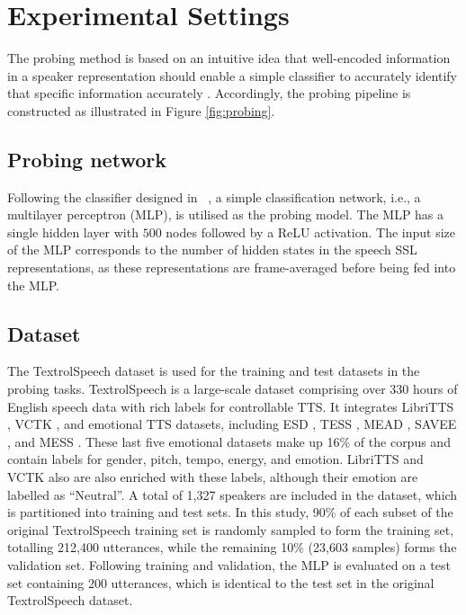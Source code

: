 \documentclass[cameraready]{Interspeech}
\begin{document}
\section{Experimental Settings}

The probing method is based on an intuitive idea that well-encoded information in a speaker representation should enable a simple classifier to accurately identify that specific information accurately \cite{wang17g_Interspeech}. Accordingly, the probing pipeline is constructed as illustrated in Figure \ref{fig:probing}.


\subsection{Probing network}

Following the classifier designed in~ \cite{wang17g_Interspeech,raj19asru}, a simple classification network, i.e., a multilayer perceptron (MLP), is utilised as the probing model. The MLP has a single hidden layer with $500$ nodes followed by a ReLU activation. The input size of the MLP corresponds to the number of hidden states in the speech SSL representations, as these representations are frame-averaged before being fed into the MLP.





\subsection{Dataset}
\label{sec:dataset}

The TextrolSpeech dataset \cite{ji2024icassp} is used for the training and test datasets in the probing tasks. TextrolSpeech is a large-scale dataset comprising over 330 hours of English speech data with rich labels for controllable TTS. It integrates LibriTTS \cite{zen19_interspeech}, VCTK \cite{vctk}, and emotional TTS datasets, including ESD \cite{ZHOU20221ESD}, TESS \cite{tess}, MEAD \cite{mead}, SAVEE \cite{savee}, and MESS \cite{mess}. These last five emotional datasets make up 16\% of the corpus and contain labels for gender, pitch, tempo, energy, and emotion. LibriTTS and VCTK also are also enriched with these labels, although their emotion are labelled as ``Neutral''. A total of 1,327 speakers are included in the dataset, which is partitioned into training and test sets. In this study, 90\% of each subset of the original TextrolSpeech training set is randomly sampled to form the training set, totalling 212,400 utterances, while the remaining 10\% (23,603 samples) forms the validation set. Following training and validation, the MLP is evaluated on a test set containing 200 utterances, which is identical to the test set in the original TextrolSpeech dataset.
\end{document}
